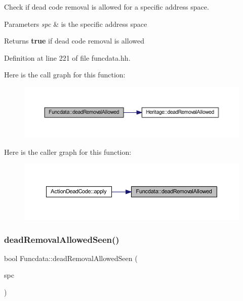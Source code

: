 Check if dead code removal is allowed for a specific address space. 


\begin{DoxyParams}{Parameters}
{\em spc} & is the specific address space \\
\hline
\end{DoxyParams}
\begin{DoxyReturn}{Returns}
{\bfseries{true}} if dead code removal is allowed 
\end{DoxyReturn}


Definition at line 221 of file funcdata.\+hh.

Here is the call graph for this function\+:
\nopagebreak
\begin{figure}[H]
\begin{center}
\leavevmode
\includegraphics[width=350pt]{class_funcdata_adaf432bbbd299e976c8f02fc97fb3dbe_cgraph}
\end{center}
\end{figure}
Here is the caller graph for this function\+:
\nopagebreak
\begin{figure}[H]
\begin{center}
\leavevmode
\includegraphics[width=350pt]{class_funcdata_adaf432bbbd299e976c8f02fc97fb3dbe_icgraph}
\end{center}
\end{figure}
\mbox{\label{class_funcdata_adba7696040378f0eaa679e684b72bf96}} 
\subsubsection{\texorpdfstring{deadRemovalAllowedSeen()}{deadRemovalAllowedSeen()}}
{\footnotesize\ttfamily bool Funcdata\+::dead\+Removal\+Allowed\+Seen (\begin{DoxyParamCaption}\item[{\mbox{\hyperlink{class_addr_space}{Addr\+Space}} $\ast$}]{spc }\end{DoxyParamCaption})\hspace{0.3cm}{\ttfamily [inline]}}



